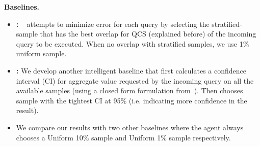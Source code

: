 


\noindent\textbf{Baselines.}
\begin{itemize}
\item \noindent\textbf{\blink:}
\blink~\cite{agarwal2013blinkdb} attempts to minimize error for each query by selecting the stratified-sample that has the best overlap for QCS (explained before) of the
incoming query to be executed. 
When no overlap with stratified samples, we use 1\% uniform sample. 

\item \noindent\textbf{\greedy:}
We develop another intelligent baseline that first calculates a confidence interval (CI) for aggregate value requested by the incoming query on all the available samples (using a closed form formulation from~\cite{mozafari2015handbook}). 
Then chooses sample with the tightest CI at 95\% (i.e. indicating more confidence in the result).

\item {}
We compare our results with two other baselines where the agent always chooses a Uniform 10\% sample and Uniform 1\% sample respectively.
\end{itemize}


